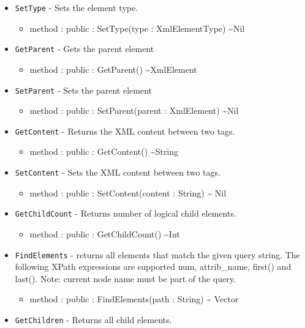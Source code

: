 \documentclass[11pt]{article}
\begin{document}
\begin{itemize}
\begin{itemize}
  \end{itemize}
\item \texttt{SetType} - Sets the element type.
  \begin{itemize}
  \item method : public : SetType(type : XmlElementType)
    \textasciitilde Nil
  \end{itemize}
\item \texttt{GetParent} - Gets the parent element
  \begin{itemize}
  \item method : public : GetParent() \textasciitilde XmlElement
  \end{itemize}
\item \texttt{SetParent} - Sets the parent element
  \begin{itemize}
  \item method : public : SetParent(parent : XmlElement)
    \textasciitilde Nil
  \end{itemize}
\item \texttt{GetContent} - Returns the XML content between two tags.
  \begin{itemize}
  \item method : public : GetContent() \textasciitilde String
  \end{itemize}
\item \texttt{SetContent} - Sets the XML content between two tags.
  \begin{itemize}
  \item method : public : SetContent(content : String) \textasciitilde
    Nil
  \end{itemize}
\item \texttt{GetChildCount} - Returns number of logical child
  elements.
  \begin{itemize}
  \item method : public : GetChildCount() \textasciitilde Int
  \end{itemize}
\item \texttt{FindElements} - returns all elements that match the
  given query string.  The following XPath expressions are supported
  num, attrib\_name, first() and last().  Note: current node name must
  be part of the query.
  \begin{itemize}
  \item method : public : FindElements(path : String) \textasciitilde
    Vector
  \end{itemize}
\item \texttt{GetChildren} - Returns all child elements.

\end{itemize}
\end{document}
